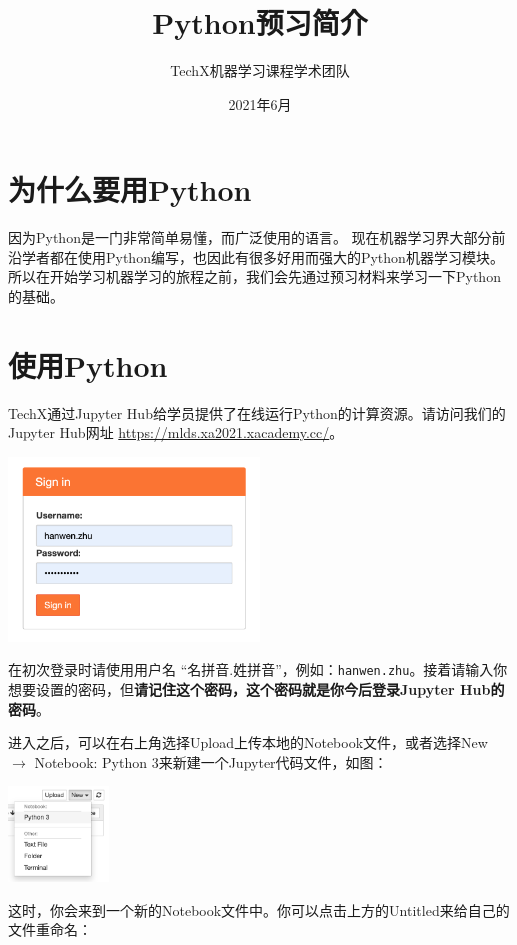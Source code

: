 \documentclass{article}
\title{Python预习简介}
\author{TechX机器学习课程学术团队}
\date{2021年6月}
\begin{document}
\maketitle

\section{为什么要用Python}
因为Python是一门非常简单易懂，而广泛使用的语言。
现在机器学习界大部分前沿学者都在使用Python编写，也因此有很多好用而强大的Python机器学习模块。
所以在开始学习机器学习的旅程之前，我们会先通过预习材料来学习一下Python的基础。

\section{使用Python}
TechX通过Jupyter Hub给学员提供了在线运行Python的计算资源。请访问我们的Jupyter Hub网址 \url{https://mlds.xa2021.xacademy.cc/}。

\vspace*{0.3cm}\centerline{\noindent\includegraphics[width=0.5\textwidth]{hub-signin.png}}

在初次登录时请使用用户名 “名拼音.\hspace*{0cm}姓拼音”，例如：\texttt{hanwen.zhu}。接着请输入你想要设置的密码，但\textbf{请记住这个密码，这个密码就是你今后登录Jupyter Hub的密码}。

进入之后，可以在右上角选择Upload上传本地的Notebook文件，或者选择New $\rightarrow$ Notebook: Python 3来新建一个Jupyter代码文件，如图：

\vspace*{0.3cm}\centerline{\noindent\includegraphics[width=0.2\textwidth]{new-ipynb.png}}

这时，你会来到一个新的Notebook文件中。你可以点击上方的Untitled来给自己的文件重命名：
\end{document}
